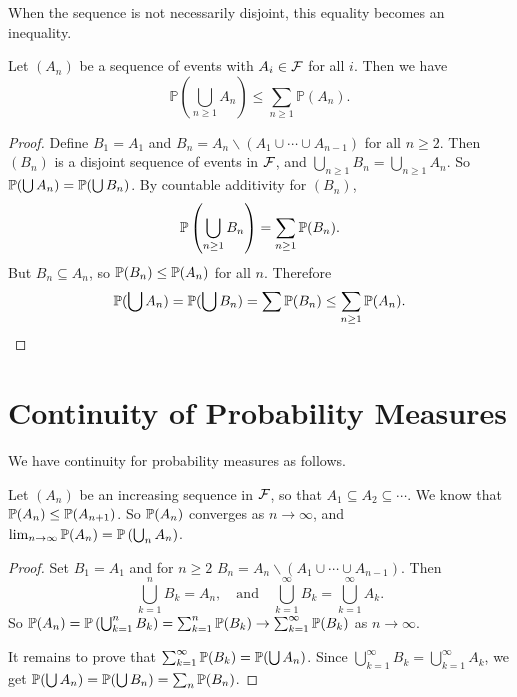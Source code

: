 \documentclass[a4paper]{scrreprt}
\begin{document}
When the sequence is not necessarily disjoint, this equality becomes an inequality. 

\begin{proposition}
	Let $(A_n)$ be a sequence of events with $A_i \in \mathcal{F}$ for all $i$. Then we have
	$$
	\mathbb{P}\left(\bigcup_{n \geq 1} A_{n}\right) \leq \sum_{n \geq 1} \mathbb{P}\left(A_{n}\right).
	$$
\end{proposition}
\begin{proof}
	Define $B_1 = A_1$ and $B_n = A_n \backslash (A_1 \cup \cdots \cup A_{n - 1})$ for all $n \geq 2$. Then $(B_n)$ is a disjoint sequence of events in $\mathcal{F}$, and $\bigcup_{n \geq 1} B_n = \bigcup_{n \geq 1} A_n$. So $\mathbb{P}(\bigcup A_n) = \mathbb{P}(\bigcup B_n)$. By countable additivity for $(B_n)$,
	$$
	\mathbb{P} \left(\bigcup_{n \geq 1} B_n\right) = \sum_{n \geq 1} \mathbb{P}(B_n).
	$$
	But $B_n \subseteq A_n$, so $\mathbb{P}(B_n) \leq \mathbb{P}(A_n)$ for all $n$. Therefore
	$$
	\mathbb{P}(\bigcup A_n) = \mathbb{P}(\bigcup B_n) = \sum \mathbb{P}(B_n) \leq \sum_{n \geq 1} \mathbb{P}(A_n).
	$$
\end{proof}

\section{Continuity of Probability Measures}

We have continuity for probability measures as follows.

\begin{proposition}
	Let $(A_n)$ be an increasing sequence in $\mathcal{F}$, 
	so that $A_1 \subseteq A_2 \subseteq \cdots$. 
	We know that $\mathbb{P}(A_n) \leq \mathbb{P}(A_{n + 1})$. 
	So $\mathbb{P}(A_n)$ converges as $n \rightarrow \infty$, and $\lim_{n \to \infty} \mathbb{P}(A_n) = \mathbb{P}\left(\bigcup_n A_n\right)$.
\end{proposition}
\begin{proof}
	Set $B_1 = A_1$ and for $n \geq 2$ $B_n = A_n \backslash (A_1 \cup \cdots \cup A_{n - 1})$. Then
	$$
	\bigcup_{k =1}^{n} B_k = A_n, \quad \text{and} \quad \bigcup_{k = 1}^\infty B_k = \bigcup_{k = 1}^{\infty} A_k.
	$$
	So $\mathbb{P}(A_n) = \mathbb{P}\left(\bigcup_{k = 1}^n B_k\right) = \sum_{k = 1}^n \mathbb{P}(B_k) \rightarrow \sum_{k = 1}^{\infty} \mathbb{P}(B_k)$ as $n \rightarrow \infty$.

	It remains to prove that $\sum_{k = 1}^{\infty} \mathbb{P}(B_k) = \mathbb{P}(\bigcup A_n)$. Since $\bigcup_{k = 1}^{\infty} B_k = \bigcup_{k = 1}^{\infty} A_k$, we get $\mathbb{P}(\bigcup A_n) = \mathbb{P}(\bigcup B_n) = \sum_n \mathbb{P}(B_n)$.
\end{proof}
\end{document}
